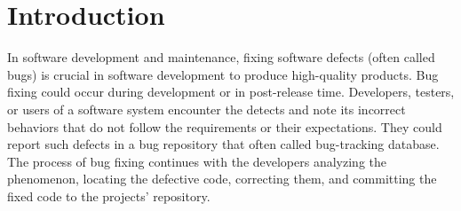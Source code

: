 \section{Introduction}
\label{intro}



In software development and maintenance, fixing software defects
(often called bugs) is crucial in software development to produce
high-quality products. Bug fixing could occur during development or
in post-release time. Developers, testers, or users of a software
system encounter the detects and note its incorrect behaviors that do
not follow the requirements or their expectations. They could report
such defects in a bug repository that often called bug-tracking
database.  The process of bug fixing continues with the developers
analyzing the phenomenon, locating the defective code, correcting
them, and committing the fixed code to the projects' repository.



